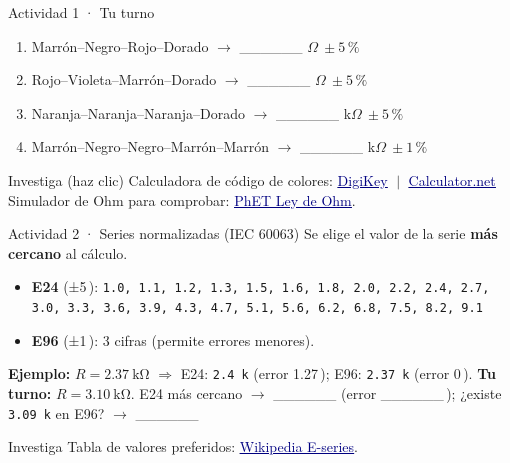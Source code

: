 \documentclass[aspectratio=169]{beamer}
\newcommand{\enlace}[2]{\href{#1}{\textcolor{navy}{\underline{#2}}}}
\begin{document}
\begin{frame}{Actividad 1 · Tu turno}
  \begin{enumerate}
    \item Marrón–Negro–Rojo–Dorado  $\rightarrow$ \_\_\_\_\_\_ $\Omega\ \pm5\,\text{\%}$
    \item Rojo–Violeta–Marrón–Dorado  $\rightarrow$ \_\_\_\_\_\_ $\Omega\ \pm5\,\text{\%}$
    \item Naranja–Naranja–Naranja–Dorado  $\rightarrow$ \_\_\_\_\_\_ k$\Omega\ \pm5\,\text{\%}$
    \item Marrón–Negro–Negro–Marrón–Marrón  $\rightarrow$ \_\_\_\_\_\_ k$\Omega\ \pm1\,\text{\%}$
  \end{enumerate}
  \pause
  \begin{block}{Investiga (haz clic)}
    \small
    Calculadora de código de colores:
    \enlace{https://www.digikey.com/en/resources/conversion-calculators/conversion-calculator-resistor-color-code}{DigiKey}
    $\;|\;$
    \enlace{https://www.calculator.net/resistor-color-code-calculator.html}{Calculator.net}\\
    Simulador de Ohm para comprobar: \enlace{https://phet.colorado.edu/sims/html/ohms-law/latest/ohms-law_en.html}{PhET Ley de Ohm}.
  \end{block}
\end{frame}

\begin{frame}{Actividad 2 · Series normalizadas (IEC 60063)}
  Se elige el valor de la serie \textbf{más cercano} al cálculo.
  \begin{itemize}
    \item \textbf{E24} (±5\,\text{\%}): \texttt{1.0, 1.1, 1.2, 1.3, 1.5, 1.6, 1.8, 2.0, 2.2, 2.4, 2.7, 3.0, 3.3, 3.6, 3.9, 4.3, 4.7, 5.1, 5.6, 6.2, 6.8, 7.5, 8.2, 9.1}
    \item \textbf{E96} (±1\,\text{\%}): 3 cifras (permite errores menores).
  \end{itemize}
  \vspace{0.3em}
  \textbf{Ejemplo:} $R = \SI{2.37}{\kilo\ohm}$ $\Rightarrow$ E24: \texttt{2.4 k} (error 1.27\,\text{\%}); E96: \texttt{2.37 k} (error 0\,\text{\%}).
  \pause
  \vspace{0.4em}
  \textbf{Tu turno:} $R = \SI{3.10}{\kilo\ohm}$. E24 más cercano $\rightarrow$ \_\_\_\_\_\_ (error \_\_\_\_\_\_\,\text{\%}); ¿existe \texttt{3.09 k} en E96? $\rightarrow$ \_\_\_\_\_\_

  \pause
  \begin{block}{Investiga}
   \small
    Tabla de valores preferidos: \enlace{https://en.wikipedia.org/wiki/E_series_of_preferred_numbers}{Wikipedia E-series}.
  \end{block}
\end{frame}
\end{document}
